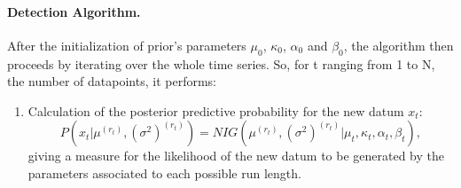 \documentclass[11pt,twoside,a4paper]{report}
\begin{document}
\paragraph{Detection Algorithm.}

After the initialization of prior's parameters $\mu_0$, $\kappa_0$, $\alpha_0$ and $\beta_0$, the algorithm then proceeds by iterating over the whole time series. So, for t ranging from 1 to N, the number of datapoints, it performs:
 
\begin{enumerate}

\item Calculation of the posterior predictive probability for the new datum $x_t$:
\begin{equation}\label{eq:first}
P(x_t | \mu^{(r_t)}, (\sigma^2)^{(r_t)}) = NIG(\mu^{(r_t)}, (\sigma^2)^{(r_t)} | \mu_t, \kappa_t, \alpha_t, \beta_t),
\end{equation} 
giving a measure for the likelihood of the new datum to be generated by the parameters associated to each possible run length.


\end{enumerate}
\end{document}
